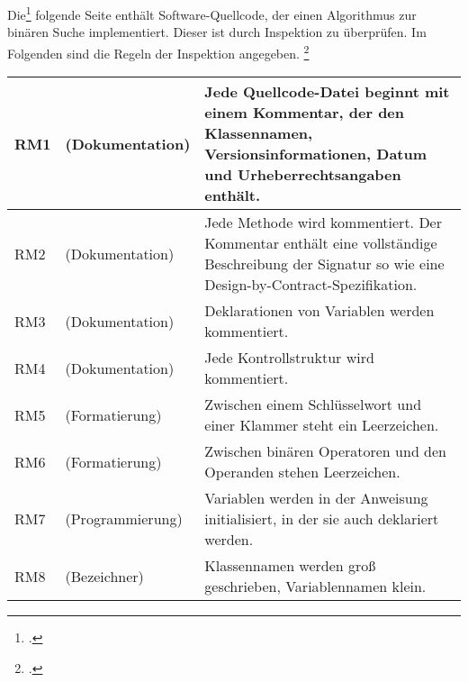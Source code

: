 \documentclass{bschlangaul-aufgabe}
\begin{document}

Die\footcite[Aufgabe 3]{sosy:ab:9} folgende Seite enthält
Software-Quellcode, der einen Algorithmus zur binären Suche implementiert. Dieser ist durch Inspektion zu überprüfen. Im
Folgenden sind die Regeln der Inspektion angegeben.
\footcite[Thema 1 Teilaufgabe 2 Aufgabe 4]{examen:66116:2017:09}

\bigskip

\noindent
\begin{tabularx}{\linewidth}{|l|l|X|}
\hline
RM1 &
(Dokumentation) &
Jede Quellcode-Datei beginnt mit einem Kommentar, der den Klassennamen,
Versionsinformationen, Datum und Urheberrechtsangaben enthält.

\\\hline

RM2 &
(Dokumentation) &
Jede Methode wird kommentiert. Der Kommentar enthält eine vollständige
Beschreibung der Signatur so wie eine
Design-by-Contract-Spezifikation\index{Design by Contract}.

\\\hline

RM3 &
(Dokumentation) &
Deklarationen von Variablen werden kommentiert.
\\\hline

RM4 &
(Dokumentation) &
Jede Kontrollstruktur wird kommentiert.
\\\hline

RM5 &
(Formatierung) &
Zwischen einem Schlüsselwort und einer Klammer steht
ein Leerzeichen.
\\\hline

RM6 &
(Formatierung) &
Zwischen binären Operatoren und den Operanden stehen
Leerzeichen.
\\\hline

RM7 &
(Programmierung) &
Variablen werden in der Anweisung initialisiert, in der sie
auch deklariert werden.
\\\hline

RM8 &
(Bezeichner) &
Klassennamen werden groß geschrieben, Variablennamen klein.
\\\hline
\end{tabularx}
\end{document}

